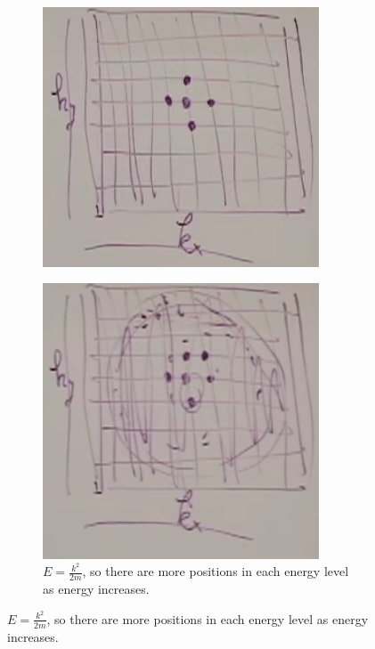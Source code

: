 \documentclass[]{article}
\begin{document}
\begin{figure}[H]
\begin{subfigure}{0.32\textwidth}
		\includegraphics[width=0.9\textwidth]{5-electrons}
	\end{subfigure}
	\begin{subfigure}{0.32\textwidth}
		\caption{$E=\frac{k^2}{2m}$, so there are more positions in each energy level as energy increases.}
		\includegraphics[width=0.9\textwidth]{more-fermions}
	\end{subfigure}
\end{figure}
\end{document}
